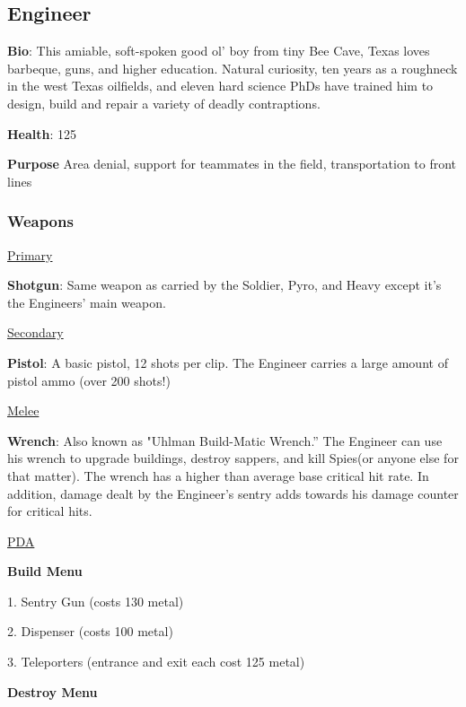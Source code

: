 \subsection{Engineer}
{\bf Bio}:
This amiable, soft-spoken good ol' boy from tiny Bee Cave, Texas loves barbeque, guns, and higher education. Natural curiosity, ten years as a roughneck in the west Texas oilfields, and eleven hard science PhDs have trained him to design, build and repair a variety of deadly contraptions.

{\bf Health}: 125

{\bf Purpose}
Area denial, support for teammates in the field, transportation to front lines

\subsubsection {Weapons}


\begin {center}
\underline {Primary}
\end {center}

{\bf Shotgun}: Same weapon as carried by the Soldier, Pyro, and Heavy except it's the Engineers' main weapon.


\begin {center}
\underline {Secondary}
\end {center}

{\bf Pistol}: A basic pistol, 12 shots per clip. The Engineer carries a large amount of pistol ammo (over 200 shots!)


\begin {center}
\underline {Melee}
\end {center}

{\bf Wrench}: Also known as "Uhlman Build-Matic Wrench.” The Engineer can use his wrench to upgrade buildings, destroy sappers, and kill Spies(or anyone else for that matter). The wrench has a higher than average base critical hit rate.  In addition, damage dealt by the Engineer's sentry adds towards his damage counter for critical hits.


\begin {center}
\underline {PDA}
\end {center}
{\bf Build Menu}

1.       Sentry Gun (costs 130 metal)

2.       Dispenser (costs 100 metal)

3.       Teleporters (entrance and exit each cost 125 metal)


{\bf Destroy Menu}

